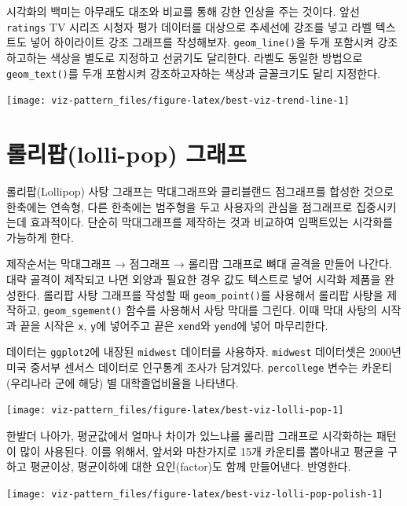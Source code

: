 \documentclass[
]{book}
\begin{document}
시각화의 백미는 아무래도 대조와 비교를 통해 강한 인상을 주는 것이다.
앞선 \texttt{ratings} TV 시리즈 시청자 평가 데이터를 대상으로 추세선에 강조를 넣고 라벨 텍스트도 넣어
하이라이트 강조 그래프를 작성해보자.
\texttt{geom\_line()}을 두개 포함시켜 강조하고하는 색상을 별도로 지정하고 선굵기도 달리한다.
라벨도 동일한 방법으로 \texttt{geom\_text()}를 두개 포함시켜 강조하고자하는 색상과 글꼴크기도 달리 지정한다.

\begin{center}\texttt{[image: viz-pattern\_files/figure-latex/best-viz-trend-line-1]} \end{center}

\hypertarget{gghighlight-barplot-color}{%
\section{롤리팝(lolli-pop) 그래프}\label{gghighlight-barplot-color}}

롤리팝(Lollipop) 사탕 그래프는 막대그래프와 클리블랜드 점그래프를 합성한 것으로 한축에는 연속형, 다른 한축에는 범주형을 두고 사용자의 관심을 점그래프로 집중시키는데 효과적이다. 단순히 막대그래프를 제작하는 것과 비교하여 임팩트있는 시각화를 가능하게 한다.

제작순서는 막대그래프 → 점그래프 → 롤리팝 그래프로 뼈대 골격을 만들어 나간다.
대략 골격이 제작되고 나면 외양과 필요한 경우 값도 텍스트로 넣어 시각화 제품을 완성한다.
롤리팝 사탕 그래프를 작성할 때 \texttt{geom\_point()}를 사용해서 롤리팝 사탕을 제작하고,
\texttt{geom\_sgement()} 함수를 사용해서 사탕 막대를 그린다. 이때 막대 사탕의 시작과 끝을
시작은 \texttt{x}, \texttt{y}에 넣어주고 끝은 \texttt{xend}와 \texttt{yend}에 넣어 마무리한다.

데이터는 \texttt{ggplot2}에 내장된 \texttt{midwest} 데이터를 사용하자. \texttt{midwest} 데이터셋은
2000년 미국 중서부 센서스 데이터로 인구통계 조사가 담겨있다.
\texttt{percollege} 변수는 카운티(우리나라 군에 해당) 별 대학졸업비율을 나타낸다.

\begin{center}\texttt{[image: viz-pattern\_files/figure-latex/best-viz-lolli-pop-1]} \end{center}

한발더 나아가, 평균값에서 얼마나 차이가 있느냐를 롤리팝 그래프로 시각화하는 패턴이 많이 사용된다.
이를 위해서, 앞서와 마찬가지로 15개 카운티를 뽑아내고 평균을 구하고 평균이상, 평균이하에 대한 요인(factor)도 함께 만들어낸다.
반영한다.

\begin{center}\texttt{[image: viz-pattern\_files/figure-latex/best-viz-lolli-pop-polish-1]} \end{center}
\end{document}
